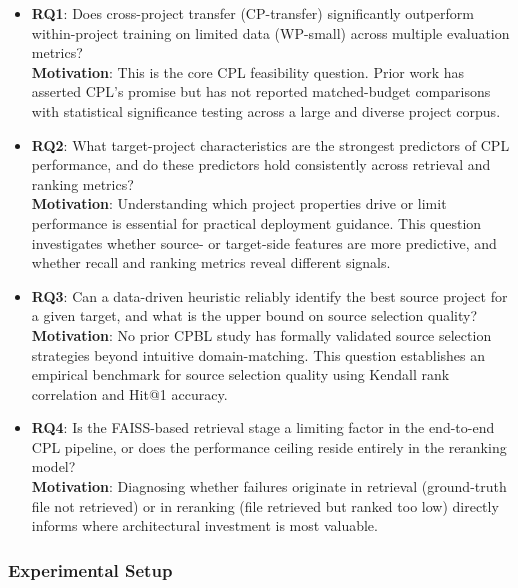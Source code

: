 \documentclass[12pt,table,xcdraw]{article}
\begin{document}
\begin{itemize}
    \item \textbf{RQ1}: Does cross-project transfer (CP-transfer) significantly outperform within-project training on limited data (WP-small) across multiple evaluation metrics?\\
    \textbf{Motivation}: This is the core CPL feasibility question. Prior work has asserted CPL's promise but has not reported matched-budget comparisons with statistical significance testing across a large and diverse project corpus.

    \item \textbf{RQ2}: What target-project characteristics are the strongest predictors of CPL performance, and do these predictors hold consistently across retrieval and ranking metrics?\\
    \textbf{Motivation}: Understanding which project properties drive or limit performance is essential for practical deployment guidance. This question investigates whether source- or target-side features are more predictive, and whether recall and ranking metrics reveal different signals.

    \item \textbf{RQ3}: Can a data-driven heuristic reliably identify the best source project for a given target, and what is the upper bound on source selection quality?\\
    \textbf{Motivation}: No prior CPBL study has formally validated source selection strategies beyond intuitive domain-matching. This question establishes an empirical benchmark for source selection quality using Kendall rank correlation and Hit@1 accuracy.

    \item \textbf{RQ4}: Is the FAISS-based retrieval stage a limiting factor in the end-to-end CPL pipeline, or does the performance ceiling reside entirely in the reranking model?\\
    \textbf{Motivation}: Diagnosing whether failures originate in retrieval (ground-truth file not retrieved) or in reranking (file retrieved but ranked too low) directly informs where architectural investment is most valuable.
\end{itemize}

\subsubsection{Experimental Setup}
\end{document}
